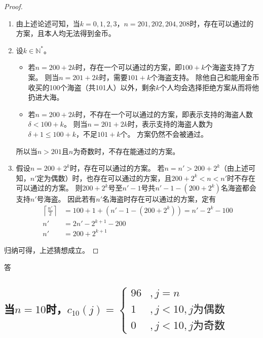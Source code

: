 \documentclass[answers]{exam}
\begin{document}
\begin{questions}
\begin{solution}
        \begin{proof}
            \begin{enumerate}
                \item 由上述论述可知，当$k=0,1,2,3$，$n=201,202,204,208$时，存在可以通过的方案，且本人均无法得到金币。
                \item {
                      设$k \in \mathbb{N}^*$。
                      \begin{itemize}
                          \item 若$n=200+2k$时，存在一个可以通过的方案，即$100 + k$个海盗支持了方案。
                                则当$n=201+2k$时，需要$101 + k$个海盗支持。
                                除他自己和能用金币收买的100个海盗（共101人）以外，剩余$k$个人均会选择拒绝方案从而将他扔进大海。
                          \item 若$n=200+2k$时，不存在一个可以通过的方案，即表示支持的海盗人数$\delta < 100 + k$。
                                则当$n=201+2k$时，表示支持的海盗人数为$\delta + 1 \leq 100 + k$，不足$101 + k$个。
                                方案仍然不会被通过。
                      \end{itemize}
                      所以当$n > 201$且$n$为奇数时，不存在能通过的方案。
                      }
                \item {
                      假设$n=200+2^k$时，存在可以通过的方案。
                      若$n = n' > 200+2^k$（由上述可知，$n'$定为偶数）时，也存在可以通过的方案，且$200+2^k < n < n'$时不存在可以通过的方案。
                      则$200+2^k$号至$n'-1$号共$n'-1 - (200+2^k)$名海盗都会支持$n'$号海盗。
                      因此若有$n'$名海盗时存在可以通过的方案，定有\begin{align*}
                          \left\lceil \frac{n'}{2} \right\rceil & = 100 + 1 + (n'-1 - (200+2^k)) = n' - 2^k - 100 \\
                          n'                                    & = 2n' - 2^{k+1} - 200                           \\
                          n'                                    & = 200 + 2^{k+1}
                      \end{align*}
                      }
            \end{enumerate}
            归纳可得，上述猜想成立。
        \end{proof}

        \textsf{答} \quad
        \begin{parts}
            \part{
                当$n=10$时，$
                    c_{10}(j) = \begin{cases}
                        96 & , j=n                    \\
                        1  & , j<10 , j \text{为偶数} \\
                        0  & , j<10 , j \text{为奇数}
                    \end{cases}
                $
            }

\end{parts}
\end{solution}
\end{questions}
\end{document}
